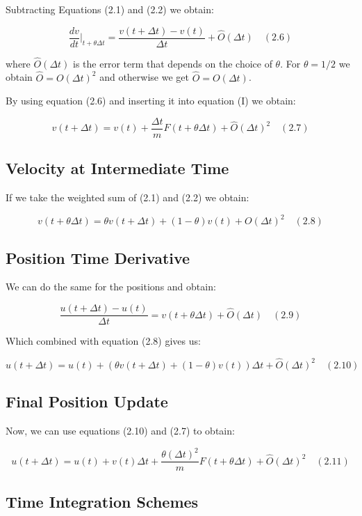 \documentclass[
  11pt,
  a4paper,
]{scrbook}
\begin{document}
Subtracting Equations (2.1) and (2.2) we obtain:

\[
\frac{dv}{dt}\bigg|_{t+\theta \Delta t} = \frac{v(t + \Delta t) - v(t)}{\Delta t} + \hat{O}(\Delta t) \quad (2.6)
\]

where \(\hat{O}(\Delta t)\) is the error term that depends on the choice
of \(\theta\). For \(\theta=1/2\) we obtain \(\hat{O}=O(\Delta t)^2\)
and otherwise we get \(\hat{O}=O(\Delta t)\).

By using equation (2.6) and inserting it into equation (I) we obtain:

\[
v(t + \Delta t) = v(t) + \frac{\Delta t}{m} F(t + \theta \Delta t) + \hat{O}(\Delta t)^2 \quad (2.7)
\]

\subsection{Velocity at Intermediate
Time}\label{velocity-at-intermediate-time}

If we take the weighted sum of (2.1) and (2.2) we obtain:

\[
v(t+\theta \Delta t) = \theta v(t+\Delta t) + (1-\theta) v(t) + O(\Delta t)^2 \quad (2.8)
\]

\subsection{Position Time Derivative}\label{position-time-derivative}

We can do the same for the positions and obtain:

\[
\frac{u(t+\Delta t)-u(t)}{\Delta t} = v(t+\theta \Delta t) + \hat{O}(\Delta t) \quad (2.9)
\]

Which combined with equation (2.8) gives us:

\[
u(t + \Delta t) = u(t) + (\theta v(t + \Delta t) + (1 - \theta)v(t)) \Delta t + \hat{O}(\Delta t)^2 \quad (2.10)
\]

\subsection{Final Position Update}\label{final-position-update}

Now, we can use equations (2.10) and (2.7) to obtain:

\[
u(t + \Delta t) = u(t) + v(t) \Delta t + \frac{\theta (\Delta t)^2}{m} F(t + \theta \Delta t) + \hat{O}(\Delta t)^2 \quad(2.11)
\]

\subsection{Time Integration Schemes}\label{time-integration-schemes}
\end{document}

